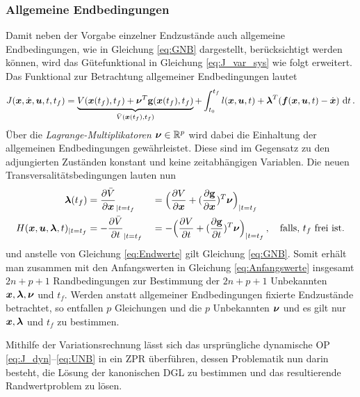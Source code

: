 \subsubsection{Allgemeine Endbedingungen}\label{subsubsec:Allg_Endbedingungen}
Damit neben der Vorgabe einzelner Endzustände auch allgemeine Endbedingungen, wie in Gleichung \eqref{eq:GNB} dargestellt, berücksichtigt werden können, wird das Gütefunktional in Gleichung \eqref{eq:J_var_sys} wie folgt erweitert. Das Funktional zur Betrachtung allgemeiner Endbedingungen lautet
\begin{equation}
J(\boldsymbol{x},\dot{\boldsymbol{x}},\boldsymbol{u},t,t_f) = \underbrace{V(\boldsymbol{x}(t_f),t_f) + \boldsymbol{\nu}^T\mathbf{g}(\boldsymbol{x}(t_f),t_f)}_{\bar{V}(\boldsymbol{x}(t_f),t_f)} + \int_{t_0}^{t_f}l(\boldsymbol{x},\boldsymbol{u},t) + \boldsymbol{\lambda}^T(\boldsymbol{f}(\boldsymbol{x},\boldsymbol{u},t) - \dot{\boldsymbol{x}})~\textrm{d}{t}\,. \label{eq:J_var_sys_allgemein}
\end{equation}
Über die \textit{Lagrange-Multiplikatoren} $\boldsymbol{\nu}\in\mathbb{R}^p$ wird dabei die Einhaltung der allgemeinen Endbedingungen gewährleistet. Diese sind im Gegensatz zu den adjungierten Zuständen konstant und keine zeitabhängigen Variablen. Die neuen Transversalitätsbedingungen lauten nun \cite{KnutGraichen.2012}
\begin{alignat}{2}
\boldsymbol{\lambda}(t_f) &= \frac{\partial \bar{V}}{\partial \boldsymbol{x}}_{|t=t_f} & &= \Big(\frac{\partial V}{\partial \boldsymbol{x}} + (\frac{\partial \mathbf{g}}{\partial \boldsymbol{x}})^T\boldsymbol{\nu}\Big)_{|t=t_f} \label{eq:Lambdaend_allgemein} \\
H(\boldsymbol{x},\boldsymbol{u},\boldsymbol{\lambda},t)_{|t=t_f} &= - \frac{\partial \bar{V}}{\partial t}_{|t=t_f} & &= -\Big(\frac{\partial V}{\partial t}+(\frac{\partial \mathbf{g}}{\partial t})^T\boldsymbol{\nu}\Big)_{|t=t_f}\,,\quad \textrm{falls, $t_f$ frei ist.} \label{eq:Transversalitaet_allgemein}
\end{alignat}
und anstelle von Gleichung \eqref{eq:Endwerte} gilt Gleichung \eqref{eq:GNB}. Somit erhält man zusammen mit den Anfangswerten in Gleichung \eqref{eq:Anfangswerte} insgesamt $2n+p+1$ Randbedingungen zur Bestimmung der $2n+p+1$ Unbekannten $\boldsymbol{x}, \boldsymbol{\lambda}, \boldsymbol{\nu}$ und $t_f$. Werden anstatt allgemeiner Endbedingungen fixierte Endzustände betrachtet, so entfallen $p$ Gleichungen und die $p$ Unbekannten $\boldsymbol{\nu}$ und es gilt nur $\boldsymbol{x}, \boldsymbol{\lambda}$ und $t_f$ zu bestimmen.

Mithilfe der Variationsrechnung lässt sich das ursprüngliche dynamische \gls{OP} \eqref{eq:J_dyn}--\eqref{eq:UNB} in ein \gls{ZPR} überführen, dessen Problematik nun darin besteht, die Lösung der kanonischen \gls{DGL} zu bestimmen und das resultierende Randwertproblem zu lösen. 

